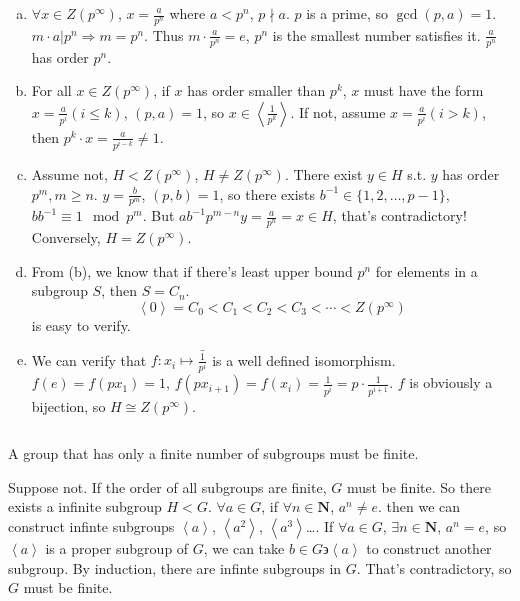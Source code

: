 \begin{answer}
    \begin{enumerate}[(a)]
        \item $\forall  x\in Z(p^{\infty})$, $x=\frac{a}{p^{n}}$ where $a<p^{n}$, $p\nmid a$. $p$ is a prime, so $\gcd(p,a)=1$. $m\cdot a|p^{n}\Rightarrow m=p^{n}$. Thus $m\cdot \frac{a}{p^{n}}=e$, $p^{n}$ is the smallest number satisfies it. $\frac{a}{p^{n}}$ has order $p^{n}$.
        \item For all $x\in Z(p^{\infty})$, if $x$ has order smaller than $p^{k}$, $x$ must have the form $x=\frac{a}{p^{i}}(i\leq k)$, $(p,a)=1$, so $x\in\left\langle\frac{1}{p^{k}}\right\rangle$. If not, assume $x=\frac{a}{p^{i}}(i>k)$, then $p^{k}\cdot x=\frac{a}{p^{i-k}}\neq 1$.
        \item Assume not, $H< Z(p^{\infty})$, $H\neq Z(p^{\infty})$. There exist $y\in H$ s.t. $y$ has order $p^{m}, m\geq n$. $y=\frac{b}{p^{m}}$, $(p,b)=1$, so there exists $b^{-1}\in\{1,2,\dots,p-1\}$, $bb^{-1}\equiv 1\mod p^{m}$. But $ab^{-1}p^{m-n}y=\frac{a}{p^{n}}=x\in H$, that's contradictory! Conversely, $H=Z(p^{\infty})$.
        \item From (b), we know that if there's least upper bound $p^{n}$ for elements in a subgroup $S$, then $S=C_{n}$.\[\left\langle0\right\rangle=C_{0}<C_{1}<C_{2}<C_{3}<\cdots<Z(p^{\infty})\] is easy to verify.
        \item We can verify that $f:x_{i}\mapsto \bar{\frac{1}{p^{i}}}$ is a well defined isomorphism. $f(e)=f(px_{1})=1$, $f(px_{i+1})=f(x_{i})=\frac{1}{p^{i}}=p\cdot \frac{1}{p^{i+1}}$. $f$ is obviously a bijection, so $H\cong Z(p^{\infty})$.
    \end{enumerate}
\end{answer}

$$ $$

\begin{ex}
    A group that has only a finite number of subgroups must be finite.
\end{ex}

\begin{answer}
    Suppose not. If the order of all subgroups are finite, $G$ must be finite. So there exists a infinite subgroup $H<G$. $\forall  a\in G$, if $\forall n\in \mathbf{N}$, $a^{n}\neq e$. then we can construct infinte subgroups $\left\langle a\right\rangle$, $\left\langle a^{2}\right\rangle$, $\left\langle a^{3}\right\rangle$\dots. If $\forall a\in G$, $\exists n\in \mathbf{N}$, $a^{n}=e$, so $\left\langle a\right\rangle$ is a proper subgroup of $G$, we can take $b\in G\backepsilon\left\langle a\right\rangle$ to construct another subgroup. By induction, there are infinte subgroups in $G$. That's contradictory, so $G$ must be finite.
\end{answer}

